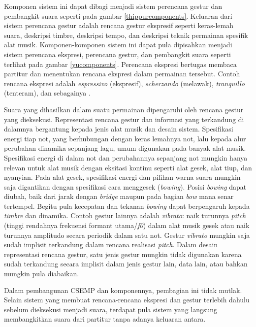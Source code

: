 Komponen sistem ini dapat dibagi menjadi sistem perencana gestur dan pembangkit suara \parencite{Thippur2013ProbabilisticMO} seperti pada gambar \ref{thippurcomponents}. Keluaran dari sistem perencana gestur adalah rencana gestur ekspresif seperti keras-lemah suara, deskripsi timbre, deskripsi tempo, dan deskripsi teknik permainan spesifik alat musik. Komponen-komponen sistem ini dapat pula dipisahkan menjadi sistem perencana ekspresi, perencana gestur, dan pembangkit suara \parencite{yu2017bowing} seperti terlihat pada gambar \ref{yucomponents}. Perencana ekspresi bertugas membaca partitur dan menentukan rencana ekspresi dalam permainan tersebut. Contoh rencana ekspresi adalah \textit{espressivo} (ekspresif), \textit{scherzando} (melawak), \textit{tranquillo} (tenteram), dan sebagainya \parencite{yang2016synthesis}.

Suara yang dihasilkan dalam suatu permainan dipengaruhi oleh rencana gestur yang dieksekusi. Representasi rencana gestur dan informasi yang terkandung di dalamnya bergantung kepada jenis alat musik dan desain sistem. Spesifikasi energi tiap not, yang berhubungan dengan keras lemahnya not, lalu kepada alur perubahan dinamika sepanjang lagu, umum digunakan pada banyak alat musik. Spesifikasi energi di dalam not dan perubahannya sepanjang not mungkin hanya relevan untuk alat musik dengan eksitasi kontinu seperti alat gesek, alat tiup, dan nyanyian. Pada alat gesek, spesifikasi energi dan pilihan warna suara mungkin saja digantikan dengan spesifikasi cara menggesek (\textit{bowing}). Posisi \textit{bowing} dapat diubah, baik dari jarak dengan \textit{bridge} maupun pada bagian \textit{bow} mana senar tertempel. Begitu pula kecepatan dan tekanan \textit{bowing} dapat berpengaruh kepada \textit{timbre} dan dinamika. \parencite{yu2017bowing} Contoh gestur lainnya adalah \textit{vibrato}: naik turunnya \textit{pitch} (tinggi rendahnya frekuensi formant utama/\textit{f0}) dalam alat musik gesek atau naik turunnya amplitudo secara periodik dalam satu not. Gestur \textit{vibrato} mungkin saja sudah implisit terkandung dalam rencana realisasi \textit{pitch}. Dalam desain representasi rencana gestur, satu jenis gestur mungkin tidak digunakan karena sudah terkandung secara implisit dalam jenis gestur lain, data lain, atau bahkan mungkin pula diabaikan.

Dalam pembangunan CSEMP dan komponennya, pembagian ini tidak mutlak. Selain sistem yang membuat rencana-rencana ekspresi dan gestur terlebih dahulu sebelum dieksekusi menjadi suara, terdapat pula sistem yang langsung membangkitkan suara dari partitur tanpa adanya keluaran antara.

